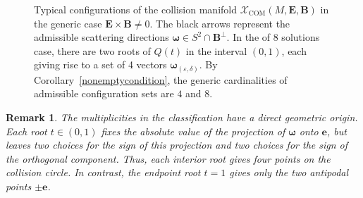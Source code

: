 \documentclass[10pt,a4paper]{amsart}
\newtheorem{remark}[theorem]{Remark}
\newcommand{\R}{\mathbb{R}}
\begin{document}
\begin{figure}[ht!]
\centering

\caption{Typical configurations of the collision manifold
$\mathcal X_{\mathrm{COM}}(M,\bm E,\bm B)$ in the generic case
$\bm E\times\bm B\neq0$. The black arrows represent the admissible
scattering directions $\bm\omega\in S^2\cap\bm B^\perp$. In the of 8 solutions case, there are two roots of $Q(t)$ in the interval $(0,1)$, each giving rise to a set of 4 vectors $\bm\omega_{(\varepsilon,\delta)}$. By Corollary~\ref{nonemptycondition}, the generic
cardinalities of admissible configuration sets are $4$ and $8$.}
\label{fig:cardinality}
\end{figure}

\begin{remark}
The multiplicities in the classification have a direct geometric origin. Each root $t\in(0,1)$ fixes the absolute value of the projection of ${\bm\omega}$ onto ${\bm e}$, but leaves two choices for the sign of this projection and two choices for the sign of the orthogonal component. Thus, each interior root gives four points on the collision circle. In contrast, the endpoint root $t=1$ gives only the two antipodal points $\pm{\bm e}$. 
\end{remark}
\end{document}

